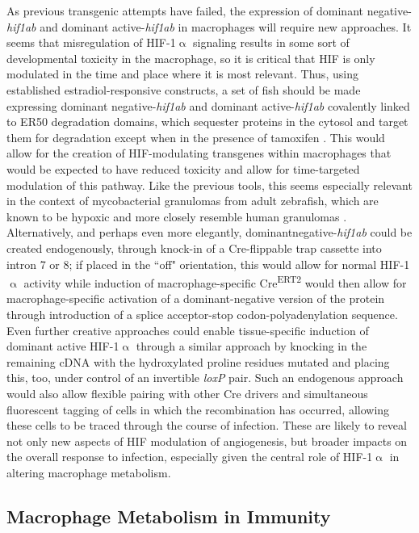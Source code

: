 As previous transgenic attempts have failed, the expression of dominant negative\hyp{}\textit{hif1ab} and dominant active\hyp{}\textit{hif1ab} in macrophages will require new approaches. It seems that misregulation of HIF\hyp{}1$\upalpha$ signaling results in some sort of developmental toxicity in the macrophage, so it is critical that HIF is only modulated in the time and place where it is most relevant. Thus, using established estradiol\hyp{}responsive constructs, a set of fish should be made expressing dominant negative\hyp{}\textit{hif1ab} and dominant active\hyp{}\textit{hif1ab} covalently linked to ER50 degradation domains, which sequester proteins in the cytosol and target them for degradation except when in the presence of tamoxifen \citep{Miyazaki2012}. This would allow for the creation of HIF\hyp{}modulating transgenes within macrophages that would be expected to have reduced toxicity and allow for time\hyp{}targeted modulation of this pathway. Like the previous tools, this seems especially relevant in the context of mycobacterial granulomas from adult zebrafish, which are known to be hypoxic and more closely resemble human granulomas \citep{Harper2012, Oehlers2015, Rustad2009}. Alternatively, and perhaps even more elegantly, dominantnegative\hyp{}\textit{hif1ab} could be created endogenously, through knock\hyp{}in of a Cre\hyp{}flippable trap cassette into intron 7 or 8; if placed in the ``off" orientation, this would allow for normal HIF\hyp{}1$\upalpha$ activity while induction of macrophage\hyp{}specific Cre\textsuperscript{ERT2} would then allow for macrophage\hyp{}specific activation of a dominant\hyp{}negative version of the protein through introduction of a splice acceptor\hyp{}stop codon\hyp{}polyadenylation sequence. Even further creative approaches could enable tissue\hyp{}specific induction of dominant active HIF\hyp{}1$\upalpha$ through a similar approach by knocking in the remaining cDNA with the hydroxylated proline residues mutated and placing this, too, under control of an invertible \textit{loxP} pair. Such an endogenous approach would also allow flexible pairing with other Cre drivers and simultaneous fluorescent tagging of cells in which the recombination has occurred, allowing these cells to be traced through the course of infection. These are likely to reveal not only new aspects of HIF modulation of angiogenesis, but broader impacts on the overall response to infection, especially given the central role of HIF\hyp{}1$\upalpha$ in altering macrophage metabolism.

\subsection{Macrophage Metabolism in Immunity}\label{metabolism}

